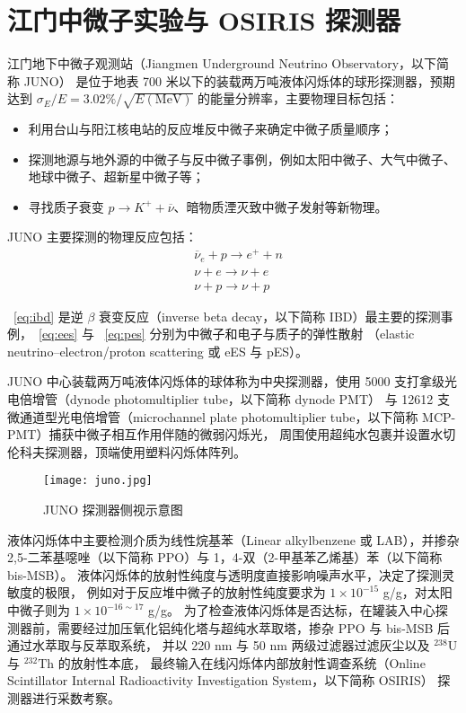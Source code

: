\section{江门中微子实验与 OSIRIS 探测器}\label{sec:osiris}
江门地下中微子观测站（Jiangmen Underground Neutrino Observatory，以下简称 JUNO）\cite{JUNOPhysicsDetector2022}
是位于地表 700 米以下的装载两万吨液体闪烁体的球形探测器，预期达到 $\sigma_E/E=3.02\%/\sqrt{E(\text{MeV})}$ 的能量分辨率，主要物理目标包括：
\begin{itemize}
    \item 利用台山与阳江核电站的反应堆反中微子来确定中微子质量顺序；
    \item 探测地源与地外源的中微子与反中微子事例，例如太阳中微子、大气中微子、地球中微子、超新星中微子等；
    \item 寻找质子衰变 $p\rightarrow K^{+}+\overline{\nu}$、暗物质湮灭致中微子发射等新物理。
\end{itemize}

JUNO 主要探测的物理反应包括：
\begin{align}
    &\overline{\nu}_e+p\rightarrow e^++n \label{eq:ibd}\\
    &\nu+e\rightarrow\nu+e \label{eq:ees}\\
    &\nu+p\rightarrow\nu+p \label{eq:pes}
\end{align}

~\eqref{eq:ibd} 是逆 $\beta$ 衰变反应（inverse beta decay，以下简称 IBD）最主要的探测事例，~\eqref{eq:ees} 与 ~\eqref{eq:pes} 分别为中微子和电子与质子的弹性散射
（elastic neutrino–electron/proton scattering 或 eES 与 pES）。

JUNO 中心装载两万吨液体闪烁体的球体称为中央探测器，使用 5000 支打拿级光电倍增管（dynode photomultiplier tube，以下简称 dynode PMT）
与 12612 支微通道型光电倍增管（microchannel plate photomultiplier tube，以下简称 MCP-PMT）捕获中微子相互作用伴随的微弱闪烁光，
周围使用超纯水包裹并设置水切伦科夫探测器，顶端使用塑料闪烁体阵列。

\begin{figure}
    \centering
    \texttt{[image: juno.jpg]}
    \caption{JUNO 探测器侧视示意图\cite{JUNOPhysicsDetector2022}}
\end{figure}

液体闪烁体中主要检测介质为线性烷基苯（Linear alkylbenzene 或 LAB），并掺杂
2,5-二苯基噁唑（以下简称 PPO）与 1，4-双（2-甲基苯乙烯基）苯（以下简称 bis-MSB）。
液体闪烁体的放射性纯度与透明度直接影响噪声水平，决定了探测灵敏度的极限，
例如对于反应堆中微子的放射性纯度要求为 $1\times10^{-15}$ g/g，对太阳中微子则为 $1\times10^{-16\sim17}$ g/g。
为了检查液体闪烁体是否达标，在罐装入中心探测器前，需要经过加压氧化铝纯化塔与超纯水萃取塔，掺杂 PPO 与 bis-MSB 后通过水萃取与反萃取系统，
并以 220 nm 与 50 nm 两级过滤器过滤灰尘以及 $^{238}\text{U}$ 与 $^{232}\text{Th}$ 的放射性本底，
最终输入在线闪烁体内部放射性调查系统（Online Scintillator Internal Radioactivity Investigation System，以下简称 OSIRIS）
探测器\cite{junocollaborationDesignSensitivityJUNO2021}进行采数考察。

